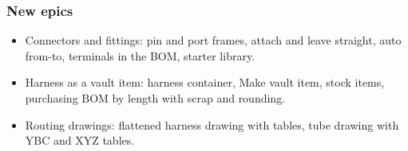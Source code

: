 \subsubsection*{New epics}
\begin{itemize}[nosep]
  \item {} Connectors and fittings: pin and port frames, attach and leave straight, auto from-to,
        terminals in the BOM, starter library.
  \item {} Harness as a vault item: harness container, Make vault item, stock items, purchasing BOM
        by length with scrap and rounding.
  \item {} Routing drawings: flattened harness drawing with tables, tube drawing with YBC and XYZ
        tables.
\end{itemize}

